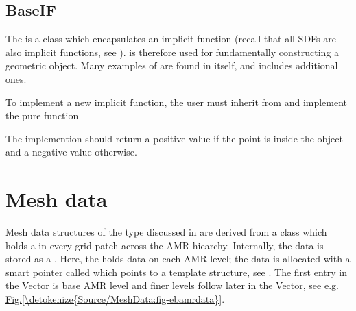 \documentclass[letterpaper,10pt,english]{sphinxmanual}
\begin{document}
\subsection{BaseIF}
\label{\detokenize{Source/ChomboBasics:baseif}}\label{\detokenize{Source/ChomboBasics:chap-baseif}}
The  is a  class which encapsulates an implicit function (recall that all SDFs are also implicit functions, see {\hyperref[\detokenize{Source/SpatialDiscretization:chap-geometryrepresentation}]{}}).
 is therefore used for fundamentally constructing a geometric object.
Many examples of  are found in  itself, and  includes additional ones.

To implement a new implicit function, the user must inherit from  and implement the pure function

\begin{sphinxVerbatim}[commandchars=\\\{\},formatcom=\scriptsize]
       
\end{sphinxVerbatim}

The implemention should return a positive value if the point  is inside the object and a negative value otherwise.


\section{Mesh data}
\label{\detokenize{Source/MeshData:mesh-data}}\label{\detokenize{Source/MeshData:chap-meshdata}}\label{\detokenize{Source/MeshData::doc}}
Mesh data structures of the type discussed in {\hyperref[\detokenize{Source/SpatialDiscretization:chap-spatialdiscretization}]{}} are derived from a class  which holds a  in every grid patch across the AMR hiearchy.
Internally, the data is stored as a .
Here, the  holds data on each AMR level; the data is allocated with a smart pointer called  which points to a  template structure, see {\hyperref[\detokenize{Source/ChomboBasics:chap-basics}]{}}.
The first entry in the Vector is base AMR level and finer levels follow later in the Vector, see e.g. \hyperref[\detokenize{Source/MeshData:fig-ebamrdata}]{Fig.\@ \ref{\detokenize{Source/MeshData:fig-ebamrdata}}}.
\end{document}
